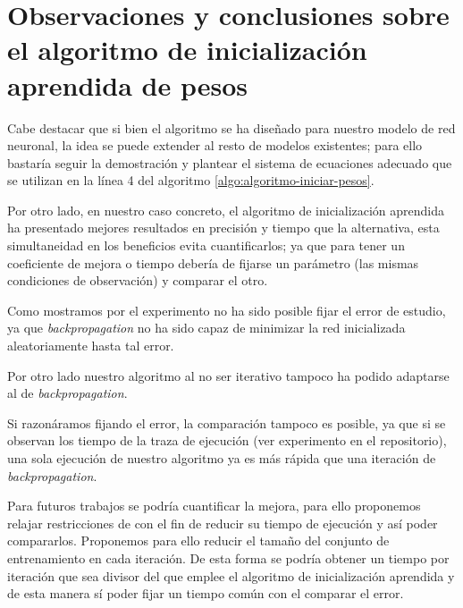 \section{Observaciones y conclusiones sobre el algoritmo de inicialización aprendida de pesos}


Cabe destacar que si bien el algoritmo se ha diseñado para nuestro 
modelo de red neuronal, la idea se puede extender al resto de modelos 
existentes; para ello bastaría seguir la
demostración y plantear el sistema de ecuaciones adecuado que se 
utilizan en la línea 4 del algoritmo \ref{algo:algoritmo-iniciar-pesos}.

Por otro lado, en nuestro caso concreto, el algoritmo
 de inicialización aprendida ha presentado 
 mejores resultados en precisión y tiempo que la 
 alternativa, esta simultaneidad en los 
 beneficios evita cuantificarlos; ya que para 
 tener un coeficiente de mejora o tiempo debería de fijarse un parámetro (las mismas condiciones de observación) y comparar el otro. 

 Como mostramos por el experimento no ha sido 
 posible fijar el error de estudio, ya que 
 \textit{backpropagation} no ha sido capaz de minimizar la red inicializada aleatoriamente 
 hasta tal error. 

 Por otro lado nuestro algoritmo al no ser iterativo tampoco ha podido adaptarse al de 
 \textit{backpropagation}. 

 Si razonáramos fijando el error, la comparación tampoco es posible, ya que si se observan los tiempo de la traza de ejecución (ver experimento en el repositorio), una sola ejecución de nuestro
 algoritmo ya es más rápida que una iteración de 
 \textit{backpropagation}. 

Para futuros trabajos se podría cuantificar la mejora, para ello
proponemos relajar restricciones de  con el fin de 
reducir su tiempo de ejecución y así poder compararlos.
 Proponemos para 
ello reducir el tamaño del conjunto de entrenamiento en cada iteración. De esta forma se podría obtener un tiempo por iteración que sea 
divisor del que emplee el algoritmo de inicialización aprendida 
y de esta manera sí poder fijar un tiempo común con el comparar el error. 
\newpage

